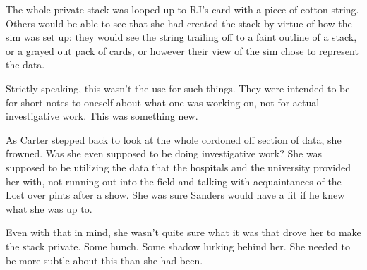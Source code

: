 The whole private stack was looped up to RJ's card with a piece of cotton string. Others would be able to see that she had created the stack by virtue of how the sim was set up: they would see the string trailing off to a faint outline of a stack, or a grayed out pack of cards, or however their view of the sim chose to represent the data.

Strictly speaking, this wasn't the use for such things. They were intended to be for short notes to oneself about what one was working on, not for actual investigative work. This was something new.

As Carter stepped back to look at the whole cordoned off section of data, she frowned. Was she even supposed to be doing investigative work? She was supposed to be utilizing the data that the hospitals and the university provided her with, not running out into the field and talking with acquaintances of the Lost over pints after a show. She was sure Sanders would have a fit if he knew what she was up to.

Even with that in mind, she wasn't quite sure what it was that drove her to make the stack private. Some hunch. Some shadow lurking behind her. She needed to be more subtle about this than she had been.
